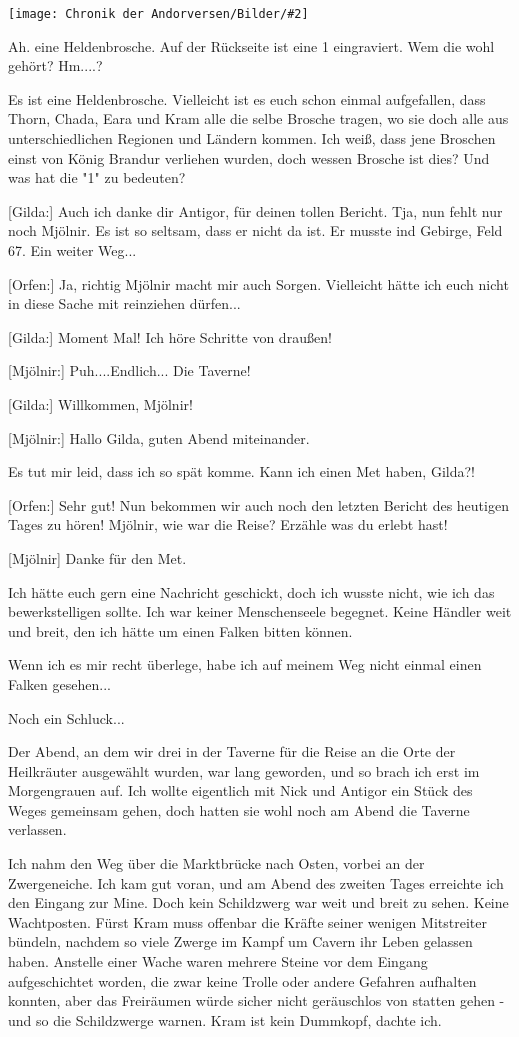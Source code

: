 \documentclass[10pt, a4paper, oneside]{book}
\newcommand{\bildmitts}[2][height=0.32\textwidth,width=0.48\textwidth,keepaspectratio]{%
    \begin{center}
        \texttt{[image: Chronik der Andorversen/Bilder/\#2]}
    \end{center}
}
\begin{document}
\begin{multicols}{2}
\bildmitts{AA2015 Die rechte Hand des Königs 2.jpeg}

Ah. eine Heldenbrosche. Auf der Rückseite ist eine 1 eingraviert. Wem die wohl gehört? Hm....?

Es ist eine Heldenbrosche. Vielleicht ist es euch schon einmal aufgefallen, dass Thorn, Chada, Eara und Kram alle die selbe Brosche tragen, wo sie doch alle aus unterschiedlichen Regionen und Ländern kommen. Ich weiß, dass jene Broschen einst von König Brandur verliehen wurden, doch wessen Brosche ist dies? Und was hat die "1" zu bedeuten?

[Gilda:] Auch ich danke dir Antigor, für deinen tollen Bericht.
Tja, nun fehlt nur noch Mjölnir. Es ist so seltsam, dass er nicht da ist. Er musste ind Gebirge, Feld 67. Ein weiter Weg...

[Orfen:] Ja, richtig Mjölnir macht mir auch Sorgen. Vielleicht hätte ich euch nicht in diese Sache mit reinziehen dürfen...

[Gilda:] Moment Mal! Ich höre Schritte von draußen!

[Mjölnir:] Puh....Endlich... Die Taverne!

[Gilda:] Willkommen, Mjölnir!

[Mjölnir:] Hallo Gilda, guten Abend miteinander.

Es tut mir leid, dass ich so spät komme. Kann ich einen Met haben, Gilda?!

[Orfen:] Sehr gut! Nun bekommen wir auch noch den letzten Bericht des heutigen Tages zu hören! Mjölnir, wie war die Reise? Erzähle was du erlebt hast!

[Mjölnir] Danke für den Met.

Ich hätte euch gern eine Nachricht geschickt, doch ich wusste nicht, wie ich das bewerkstelligen sollte. Ich war keiner Menschenseele begegnet. Keine Händler weit und breit, den ich hätte um einen Falken bitten können.

Wenn ich es mir recht überlege, habe ich auf meinem Weg nicht einmal einen Falken gesehen...

Noch ein Schluck...

Der Abend, an dem wir drei in der Taverne für die Reise an die Orte der Heilkräuter ausgewählt wurden, war lang geworden, und so brach ich erst im Morgengrauen auf. Ich wollte eigentlich mit Nick und Antigor ein Stück des Weges gemeinsam gehen, doch hatten sie wohl noch am Abend die Taverne verlassen.

Ich nahm den Weg über die Marktbrücke nach Osten, vorbei an der Zwergeneiche. Ich kam gut voran, und am Abend des zweiten Tages erreichte ich den Eingang zur Mine. Doch kein Schildzwerg war weit und breit zu sehen. Keine Wachtposten. Fürst Kram muss offenbar die Kräfte seiner wenigen Mitstreiter bündeln, nachdem so viele Zwerge im Kampf um Cavern ihr Leben gelassen haben. Anstelle einer Wache waren mehrere Steine vor dem Eingang aufgeschichtet worden, die zwar keine Trolle oder andere Gefahren aufhalten konnten, aber das Freiräumen würde sicher nicht geräuschlos von statten gehen - und so die Schildzwerge warnen. Kram ist kein Dummkopf, dachte ich.


\end{multicols}
\end{document}
